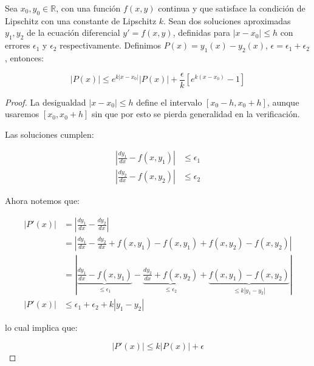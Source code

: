 		\begin{teorema}
			Sea $x_0, y_0 \in \mathbb{R}$, con una función $f(x, y)$ continua y que satisface la condición de Lipschitz con una constante de Lipschitz $k$.
			Sean dos soluciones aproximadas $y_1, y_2$ de la ecuación diferencial $y' = f(x, y)$, definidas para $|x - x_0| \leq h$ con errores $\epsilon_1$ y $\epsilon_2$ respectivamente.
			Definimos $P(x) = y_1(x) - y_2(x)$, $\epsilon = \epsilon_1 + \epsilon_2$, entonces:

			\begin{equation}
				\left| P(x) \right| \leq e^{k|x - x_0|} \left| P(x) \right| + \frac{\epsilon}{k} \left[ e^{k(x - x_0)} - 1 \right]
			\end{equation}
		\end{teorema}

		\begin{proof}
			La desigualdad $|x - x_0| \leq h$ define el intervalo $[x_0 - h, x_0 + h]$, aunque usaremos $[x_0, x_0 + h]$ sin que por esto se pierda generalidad en la verificación.

			Las soluciones cumplen:

			\begin{align*}
				\left| \frac{d y_1}{dx} - f(x, y_1) \right| &\leq \epsilon_1 \\
				\left| \frac{d y_2}{dx} - f(x, y_2) \right| &\leq \epsilon_2
			\end{align*}

			Ahora notemos que:

			\begin{align*}
				\left| P'(x) \right| &= \left| \frac{d y_1}{dx} - \frac{d y_2}{dx} \right| \\
				&= \left| \frac{d y_1}{dx} - \frac{d y_2}{dx} + f(x, y_1) - f(x, y_1) + f(x, y_2) - f(x, y_2) \right| \\
				&= \left| \underbrace{\frac{d y_1}{dx} - f(x, y_1)}_{\leq \epsilon_1} - \underbrace{\frac{d y_2}{dx} + f(x, y_2)}_{\leq \epsilon_2} + \underbrace{f(x, y_1) - f(x, y_2)}_{\leq k|y_1 - y_2|} \right| \\
				\left| P'(x) \right| &\leq \epsilon_1 + \epsilon_2 + k|y_1 - y_2|
			\end{align*}

			lo cual implica que:

			\begin{equation*}
				\left| P'(x) \right| \leq k \left| P(x) \right| + \epsilon
			\end{equation*}
		\end{proof}
